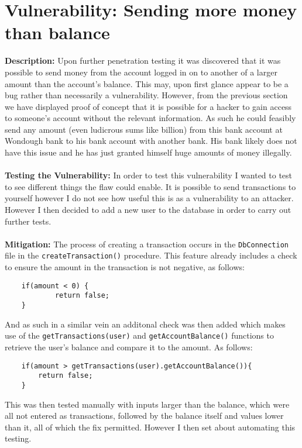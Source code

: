 \section{Vulnerability: Sending more money than balance}
\label{sec:background}
\textbf{Description:} Upon further penetration testing it was discovered that it was possible 
to send money from the account logged in on to another of a larger amount than the account's balance. This may, upon first glance appear to be a bug rather than
necessarily a vulnerability. However, from the previous section we have displayed proof of concept that it is possible for a hacker to gain access to someone's
account without the relevant information. As such he could feasibly send any amount (even ludicrous sums like  billion) from this bank account at Wondough bank
to his bank account with another bank. His bank likely does not have this issue and he has just granted himself huge amounts of money illegally. \\ \\
\textbf{Testing the Vulnerability:} In order to test this vulnerability I wanted to test to see different things the flaw could enable. It is possible to send
transactions to yourself however I do not see how useful this is as a vulnerability to an attacker. However I then decided to add a new user to the database in order
to carry out further tests. \\ \\
\textbf{Mitigation:} The process of creating a transaction occurs in the \verb|DbConnection| file in the \verb|createTransaction()| procedure. This feature already
includes a check to ensure the amount in the transaction is not negative, as follows:
\begin{verbatim}
    if(amount < 0) {
            return false;
    }
\end{verbatim}
And as such in a similar vein an additonal check was then added which makes use of the \verb|getTransactions(user)| and \verb|getAccountBalance()| functions to retrieve
the user's balance and compare it to the amount. As follows:
\begin{verbatim}
    if(amount > getTransactions(user).getAccountBalance()){
        return false;
    }
\end{verbatim}
This was then tested manually with inputs larger than the balance, which were all not entered as transactions, followed by the balance itself and values lower than it, all of
which the fix permitted. However I then set about automating this testing.